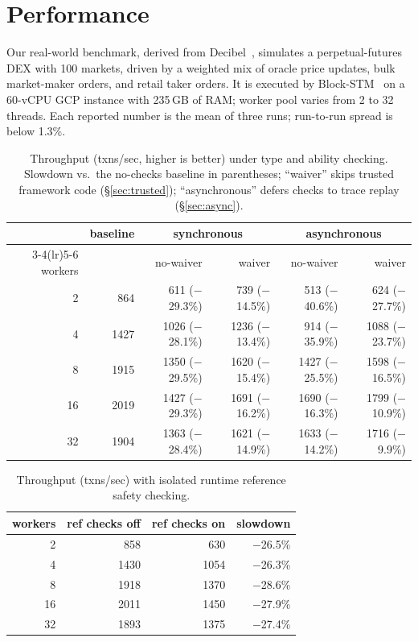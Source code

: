 \section{Performance}
\label{sec:perf}

Our real-world benchmark, derived from Decibel~\cite{Decibel}, simulates a perpetual-futures DEX with 100 markets, driven by a weighted mix of oracle price updates, bulk market-maker orders, and retail taker orders.
It is executed by Block-STM~\cite{BlockSTM} on a 60-vCPU GCP instance with 235\,GB of RAM; worker pool varies from 2 to 32 threads.
Each reported number is the mean of three runs; run-to-run spread is below 1.3\%.

\begin{table}[t]
\caption{Throughput (txns/sec, higher is better) under type and ability checking.
Slowdown vs.\ the no-checks baseline in parentheses; ``waiver'' skips trusted framework code (\S\ref{sec:trusted}); ``asynchronous'' defers checks to trace replay (\S\ref{sec:async}).}
\label{tab:perf:type}
\centering
\scriptsize
\renewcommand{\arraystretch}{0.9}
\setlength{\tabcolsep}{2pt}
\begin{tabular}{rrrrrr}
\toprule
        & baseline & \multicolumn{2}{c}{synchronous} & \multicolumn{2}{c}{asynchronous} \\
\cmidrule(lr){3-4}\cmidrule(lr){5-6}
workers & & no-waiver & waiver & no-waiver & waiver \\
\midrule
2  & 864  & 611 ($-$29.3\%)  & 739 ($-$14.5\%)  & 513 ($-$40.6\%)  & 624 ($-$27.7\%) \\
4  & 1427 & 1026 ($-$28.1\%) & 1236 ($-$13.4\%) & 914 ($-$35.9\%)  & 1088 ($-$23.7\%) \\
8  & 1915 & 1350 ($-$29.5\%) & 1620 ($-$15.4\%) & 1427 ($-$25.5\%) & 1598 ($-$16.5\%) \\
16 & 2019 & 1427 ($-$29.3\%) & 1691 ($-$16.2\%) & 1690 ($-$16.3\%) & 1799 ($-$10.9\%) \\
32 & 1904 & 1363 ($-$28.4\%) & 1621 ($-$14.9\%) & 1633 ($-$14.2\%) & 1716 ($-$\phantom{0}9.9\%) \\
\bottomrule
\end{tabular}
\end{table}

\begin{table}[t]
\caption{Throughput (txns/sec) with isolated runtime reference safety checking.}
\label{tab:perf:ref}
\centering
\scriptsize
\renewcommand{\arraystretch}{0.9}
\setlength{\tabcolsep}{2pt}
\begin{tabular}{rrrr}
\toprule
workers & ref checks off & ref checks on & slowdown \\
\midrule
2  & 858  & 630  & $-$26.5\% \\
4  & 1430 & 1054 & $-$26.3\% \\
8  & 1918 & 1370 & $-$28.6\% \\
16 & 2011 & 1450 & $-$27.9\% \\
32 & 1893 & 1375 & $-$27.4\% \\
\bottomrule
\end{tabular}
\end{table}

